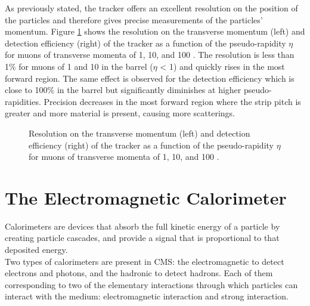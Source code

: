     As previously stated, the tracker offers an excellent resolution on the position of the particles and therefore gives precise measurements of the particles' momentum. Figure \ref{fig:lhc_and_cms__cms_tracker_performances} shows the resolution on the transverse momentum \pT{} (left) and detection efficiency (right) of the tracker as a function of the pseudo-rapidity $ \eta $ for muons of transverse momenta \pT{} of 1, 10, and 100 \GeVc{}. The resolution is less than 1\% for muons of 1 and 10 \GeVc{} in the barrel ($ \eta $ < 1) and quickly rises in the most forward region. The same effect is observed for the detection efficiency which is close to 100\% in the barrel but significantly diminishes at higher pseudo-rapidities. Precision decreases in the most forward region where the strip pitch is greater and more material is present, causing more scatterings.

    \begin{figure}[h!]
      \centering
      \caption{Resolution on the transverse momentum \pT{} (left) and detection efficiency (right) of the tracker as a function of the pseudo-rapidity $ \eta $ for muons of transverse momenta \pT{} of 1, 10, and 100 \GeVc{} \Cite{CMS_at_LHC}.}
      \label{fig:lhc_and_cms__cms_tracker_performances}
    \end{figure}



  \section{The Electromagnetic Calorimeter}

  Calorimeters are devices that absorb the full kinetic energy of a particle by creating particle cascades, and provide a signal that is proportional to that deposited energy. \\

  Two types of calorimeters are present in CMS: the electromagnetic to detect electrons and photons, and the hadronic to detect hadrons. Each of them corresponding to two of the elementary interactions through which particles can interact with the medium: electromagnetic interaction and strong interaction. \\

